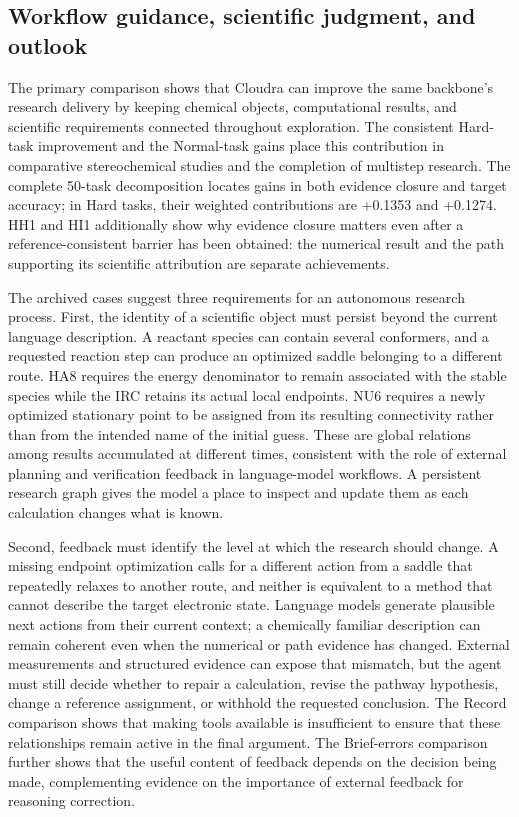 \subsection{Workflow guidance, scientific judgment, and outlook}

The primary comparison shows that Cloudra can improve the same backbone's research delivery by keeping chemical objects, computational results, and scientific requirements connected throughout exploration. The consistent Hard-task improvement and the Normal-task gains place this contribution in comparative stereochemical studies and the completion of multistep research. The complete 50-task decomposition locates gains in both evidence closure and target accuracy; in Hard tasks, their weighted contributions are +0.1353 and +0.1274. HH1 and HI1 additionally show why evidence closure matters even after a reference-consistent barrier has been obtained: the numerical result and the path supporting its scientific attribution are separate achievements.

The archived cases suggest three requirements for an autonomous research process. First, the identity of a scientific object must persist beyond the current language description. A reactant species can contain several conformers, and a requested reaction step can produce an optimized saddle belonging to a different route. HA8 requires the energy denominator to remain associated with the stable species while the IRC retains its actual local endpoints. NU6 requires a newly optimized stationary point to be assigned from its resulting connectivity rather than from the intended name of the initial guess. These are global relations among results accumulated at different times, consistent with the role of external planning and verification feedback in language-model workflows. A persistent research graph gives the model a place to inspect and update them as each calculation changes what is known.

Second, feedback must identify the level at which the research should change. A missing endpoint optimization calls for a different action from a saddle that repeatedly relaxes to another route, and neither is equivalent to a method that cannot describe the target electronic state. Language models generate plausible next actions from their current context; a chemically familiar description can remain coherent even when the numerical or path evidence has changed. External measurements and structured evidence can expose that mismatch, but the agent must still decide whether to repair a calculation, revise the pathway hypothesis, change a reference assignment, or withhold the requested conclusion. The Record comparison shows that making tools available is insufficient to ensure that these relationships remain active in the final argument. The Brief-errors comparison further shows that the useful content of feedback depends on the decision being made, complementing evidence on the importance of external feedback for reasoning correction.

